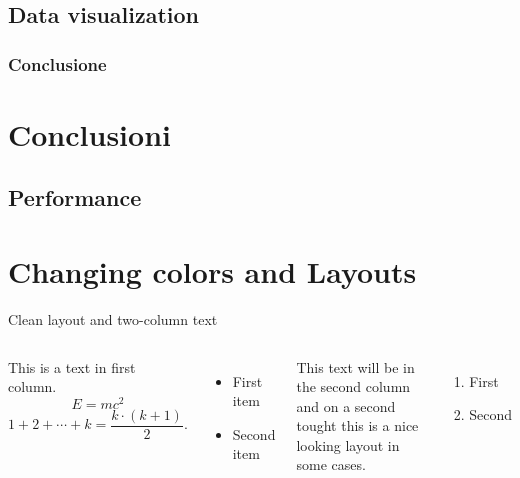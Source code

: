 \documentclass[13pt,aspectratio=169,t,xcolor=table]{beamer}
\begin{document}
\subsection{Data visualization}

\begin{frame}{}
    \frametitle{Conclusione}
\end{frame}
\section{Conclusioni}
\subsection{Performance}

\section{Changing colors and Layouts}


\begin{frame}{Clean layout and two-column text}
    
    \begin{columns}
    
        This is a text in first column.
        $$E=mc^2$$
        $$ 1 + 2 + \cdots + k =  \frac{k \cdot (k + 1)}{2}.$$
        \begin{itemize}
        \item First item
       
        \item Second item
        \end{itemize}
        
        This text will be in the second column
        and on a second tought this is a nice looking
        layout in some cases.
        
        \begin{enumerate}
            \item First
            \item Second
        \end{enumerate}
        
    \end{columns}
    
\end{frame}
\end{document}

